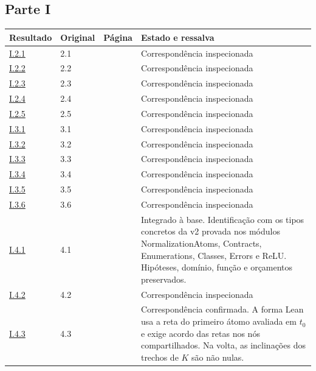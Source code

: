 \subsection*{Parte I}
\small
\begin{longtable}{@{}p{.11\linewidth}p{.09\linewidth}p{.09\linewidth}p{.59\linewidth}@{}}
\toprule Resultado & Original & Página & Estado e ressalva\\\midrule\endhead
\hyperref[map:artigo_1:2.1]{I.2.1} & 2.1 & \pageref{map:artigo_1:2.1} & Correspondência inspecionada\\[4pt]
\hyperref[map:artigo_1:2.2]{I.2.2} & 2.2 & \pageref{map:artigo_1:2.2} & Correspondência inspecionada\\[4pt]
\hyperref[map:artigo_1:2.3]{I.2.3} & 2.3 & \pageref{map:artigo_1:2.3} & Correspondência inspecionada\\[4pt]
\hyperref[map:artigo_1:2.4]{I.2.4} & 2.4 & \pageref{map:artigo_1:2.4} & Correspondência inspecionada\\[4pt]
\hyperref[map:artigo_1:2.5]{I.2.5} & 2.5 & \pageref{map:artigo_1:2.5} & Correspondência inspecionada\\[4pt]
\hyperref[map:artigo_1:3.1]{I.3.1} & 3.1 & \pageref{map:artigo_1:3.1} & Correspondência inspecionada\\[4pt]
\hyperref[map:artigo_1:3.2]{I.3.2} & 3.2 & \pageref{map:artigo_1:3.2} & Correspondência inspecionada\\[4pt]
\hyperref[map:artigo_1:3.3]{I.3.3} & 3.3 & \pageref{map:artigo_1:3.3} & Correspondência inspecionada\\[4pt]
\hyperref[map:artigo_1:3.4]{I.3.4} & 3.4 & \pageref{map:artigo_1:3.4} & Correspondência inspecionada\\[4pt]
\hyperref[map:artigo_1:3.5]{I.3.5} & 3.5 & \pageref{map:artigo_1:3.5} & Correspondência inspecionada\\[4pt]
\hyperref[map:artigo_1:3.6]{I.3.6} & 3.6 & \pageref{map:artigo_1:3.6} & Correspondência inspecionada\\[4pt]
\hyperref[map:artigo_1:4.1]{I.4.1} & 4.1 & \pageref{map:artigo_1:4.1} & Integrado à base. Identificação com os tipos concretos da v2 provada nos módulos NormalizationAtoms, Contracts, Enumerations, Classes, Errors e ReLU. Hipóteses, domínio, função e orçamentos preservados.\\[4pt]
\hyperref[map:artigo_1:4.2]{I.4.2} & 4.2 & \pageref{map:artigo_1:4.2} & Correspondência inspecionada\\[4pt]
\hyperref[map:artigo_1:4.3]{I.4.3} & 4.3 & \pageref{map:artigo_1:4.3} & Correspondência confirmada. A forma Lean usa a reta do primeiro átomo avaliada em $t_0$ e exige acordo das retas nos nós compartilhados. Na volta, as inclinações dos trechos de $K$ são não nulas.\\[4pt]

\end{longtable}
